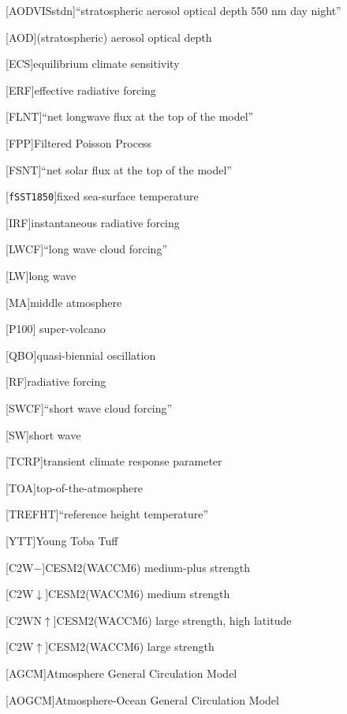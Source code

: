 \begin{acronym}[AODVISstdn]
  [AODVISstdn]{``stratospheric aerosol optical depth 550 nm day night''}

  [AOD]{(stratospheric) aerosol optical depth}

  [ECS]{equilibrium climate sensitivity}

  [ERF]{effective radiative forcing}

  [FLNT]{``net longwave flux at the top of the model''}

  [FPP]{Filtered Poisson Process}

  [FSNT]{``net solar flux at the top of the model''}

  [\texttt{fSST1850}]{fixed sea-surface temperature}

  [IRF]{instantaneous radiative forcing}

  [LWCF]{``long wave cloud forcing''}

  [LW]{long wave}

  [MA]{middle atmosphere}

  [P100]{\citet{jones2005} super-volcano}

  [QBO]{quasi-biennial oscillation}

  [RF]{radiative forcing}

  [SWCF]{``short wave cloud forcing''}

  [SW]{short wave}

  [TCRP]{transient climate response parameter}

  [TOA]{top-of-the-atmosphere}

  [TREFHT]{``reference height temperature''}

  [YTT]{Young Toba Tuff}

  [C2W\(-\)]{CESM2(WACCM6) medium-plus strength}

  [C2W\(\downarrow\)]{CESM2(WACCM6) medium strength}

  [C2WN\(\uparrow\)]{CESM2(WACCM6) large strength, high latitude}

  [C2W\(\uparrow\)]{CESM2(WACCM6) large strength}

  [AGCM]{Atmosphere General Circulation Model}

  [AOGCM]{Atmosphere-Ocean General Circulation Model}


\end{acronym}
